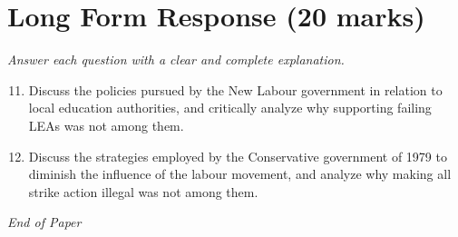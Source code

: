 \documentclass[12pt]{article}
\begin{document}
\section*{Long Form Response (20 marks)}
\textit{Answer each question with a clear and complete explanation.}
\begin{enumerate}[label=\arabic*.]
\setcounter{enumi}{10}
\item Discuss the policies pursued by the New Labour government in relation to local education authorities, and critically analyze why supporting failing LEAs was not among them.
\item Discuss the strategies employed by the Conservative government of 1979 to diminish the influence of the labour movement, and analyze why making all strike action illegal was not among them.
\end{enumerate}

\vfill
\noindent\textit{End of Paper}
\end{document}
